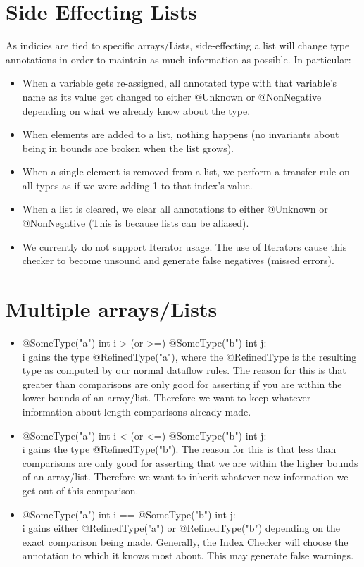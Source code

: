 \section{Side Effecting Lists\label{index-side-effects}}
As indicies are tied to specific arrays/Lists, side-effecting a list will change type annotations
in order to maintain as much information as possible. In particular:
\begin{itemize}
\item When a variable gets re-assigned, all annotated type with that variable's name as its value
get changed to either @Unknown or @NonNegative depending on what we already know about the type.
\item When elements are added to a list, nothing happens (no invariants about being in bounds are
broken when the list grows).
\item When a single element is removed from a list, we perform a transfer rule on all types as if
we were adding 1 to that index's value.
\item When a list is cleared, we clear all annotations to either @Unknown or @NonNegative (This is
because lists can be aliased).
\item We currently do not support Iterator usage. The use of Iterators cause this checker to become
unsound and generate false negatives (missed errors).
\end{itemize}

\section{Multiple arrays/Lists\label{index-multiples}}
\begin{itemize}
\item @SomeType("a") int i > (or >=) @SomeType("b") int j:\\
i gains the type @RefinedType("a"), where the @RefinedType is the resulting type as computed by our
normal dataflow rules. The reason for this is that greater than comparisons are only good for
asserting if you are within the lower bounds of an array/list. Therefore we want to keep whatever
information about length comparisons already made.
\item @SomeType("a") int i < (or <=) @SomeType("b") int j:\\
i gains the type @RefinedType("b"). The
reason for this is that less than comparisons are only good for asserting that we are within the
higher bounds of an array/list. Therefore we want to inherit whatever new information we get out of
this comparison.
\item @SomeType("a") int i == @SomeType("b") int j:\\
i gains either @RefinedType("a") or @RefinedType("b") depending on the exact comparison being made.
Generally, the Index Checker will choose the annotation to which it knows most about. This may generate
false warnings.
\end{itemize}

